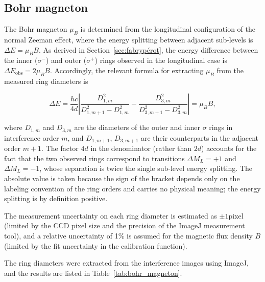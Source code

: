 \documentclass{article}
\begin{document}
\subsection{Bohr magneton}

The Bohr magneton $\mu_B$ is determined from the longitudinal configuration of the normal Zeeman effect, where the energy splitting between adjacent sub-levels is $\Delta E = \mu_B B$. As derived in Section~\ref{sec:fabrypérot}, the energy difference between the inner ($\sigma^-$) and outer ($\sigma^+$) rings observed in the longitudinal case is $\Delta E_\mathrm{obs} = 2\mu_B B$. Accordingly, the relevant formula for extracting $\mu_B$ from the measured ring diameters is

\begin{equation}
    \Delta E = \frac{hc}{4d}\left|\frac{D_{1,m}^2}{D_{1,m+1}^2 - D_{1,m}^2} - \frac{D_{3,m}^2}{D_{3,m+1}^2 - D_{3,m}^2}\right| = \mu_B B,
    \label{bohr_magneton_formula}
\end{equation}

where $D_{1,m}$ and $D_{3,m}$ are the diameters of the outer and inner $\sigma$ rings in interference order $m$, and $D_{1,m+1}$, $D_{3,m+1}$ are their counterparts in the adjacent order $m+1$. The factor $4d$ in the denominator (rather than $2d$) accounts for the fact that the two observed rings correspond to transitions $\Delta M_L = +1$ and $\Delta M_L = -1$, whose separation is twice the single sub-level energy splitting. The absolute value is taken because the sign of the bracket depends only on the labeling convention of the ring orders and carries no physical meaning; the energy splitting is by definition positive.

The measurement uncertainty on each ring diameter is estimated as $\pm 1$pixel (limited by the CCD pixel size and the precision of the ImageJ measurement tool), and a relative uncertainty of 1\% is assumed for the magnetic flux density $B$ (limited by the fit uncertainty in the calibration function).

The ring diameters were extracted from the interference images using ImageJ, and the results are listed in Table~\ref{tab:bohr_magneton}.
\end{document}
